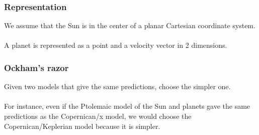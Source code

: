 \documentclass[aspectratio=169,xcolor=pdftex,dvipsnames]{beamer} %
\begin{document}

\begin{frame}
\frametitle{Representation}

We assume that the Sun is in the center of a planar Cartesian coordinate system.\\
\ \\
A planet is represented as a point and a velocity vector in 2 dimensions.

\end{frame}








\begin{frame}
\frametitle{Ockham's razor}

Given two models that give the same predictions, choose the simpler one.\\
\ \\
For instance, even if the Ptolemaic model of the Sun and planets gave the same predictions 
as the Copernican/x model, we would choose the Copernican/Keplerian model because it is simpler.

\end{frame}












\end{document}
